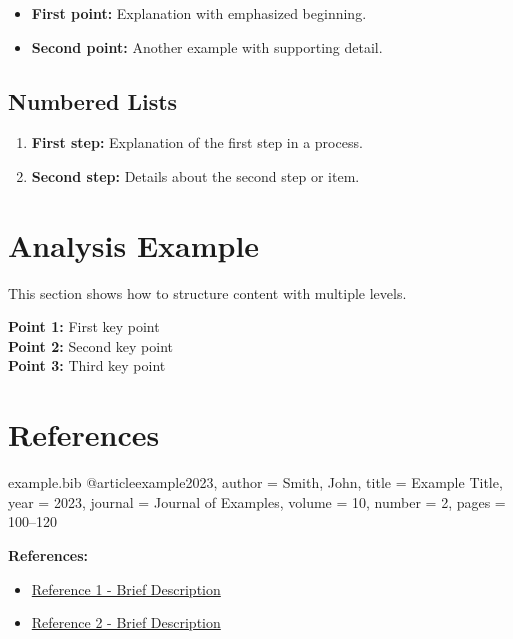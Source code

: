 \documentclass[a4paper,11pt]{article}
\begin{document}
\begin{itemize}
    \item \textbf{First point:} Explanation with emphasized beginning.
    
    \item \textbf{Second point:} Another example with supporting detail.
\end{itemize}

\subsection{Numbered Lists}

\begin{enumerate}
    \item \textbf{First step:} Explanation of the first step in a process.
    
    \item \textbf{Second step:} Details about the second step or item.
\end{enumerate}

\section{Analysis Example}

This section shows how to structure content with multiple levels.

\begin{infobox}[title=Key Points]
\textbf{Point 1:} First key point\\
\textbf{Point 2:} Second key point\\
\textbf{Point 3:} Third key point
\end{infobox}

\section{References}

\begin{filecontents*}{example.bib}
@article{example2023,
  author = {Smith, John},
  title = {Example Title},
  year = {2023},
  journal = {Journal of Examples},
  volume = {10},
  number = {2},
  pages = {100--120}
}
\end{filecontents*}

\textbf{References:}
\begin{itemize}
    \item \href{https://example.com/source1}{Reference 1 - Brief Description}
    \item \href{https://example.com/source2}{Reference 2 - Brief Description}
\end{itemize}


\label{LastPage}
\end{document}
